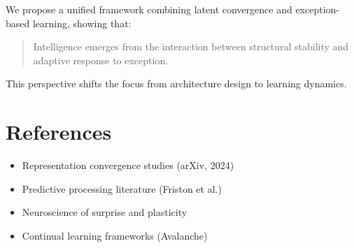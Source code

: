 \documentclass[11pt]{article}
\begin{document}
We propose a unified framework combining latent convergence and exception-based learning, showing that:

\begin{quote}
Intelligence emerges from the interaction between structural stability and adaptive response to exception.
\end{quote}

This perspective shifts the focus from architecture design to learning dynamics.

\section*{References}

\begin{itemize}
    \item Representation convergence studies (arXiv, 2024)
    \item Predictive processing literature (Friston et al.)
    \item Neuroscience of surprise and plasticity
    \item Continual learning frameworks (Avalanche)
\end{itemize}
\end{document}
